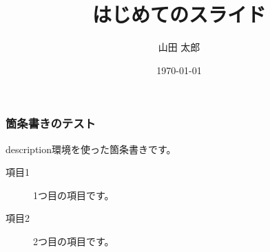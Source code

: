 \documentclass{beamer}
\title{はじめてのスライド}
\author{山田 太郎}
\institute{羅手府大学}
\date{\today}
\begin{document}
\maketitle
\begin{frame}
  \frametitle{箇条書きのテスト}
  description環境を使った箇条書きです。
  \begin{description}
    \item[項目1]
    1つ目の項目です。
    \item[項目2]
    2つ目の項目です。
  \end{description}
\end{frame}
\end{document}
